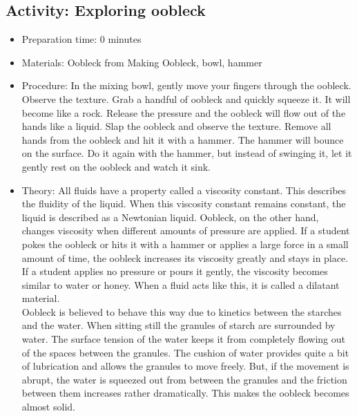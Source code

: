\begin{itemize}
{\begin{itemize}
\subsection{Activity: Exploring oobleck}
\begin{itemize}
\item{Preparation time: 0 minutes}
\item{Materials: Oobleck from Making Oobleck, bowl, hammer}
\item{Procedure: In the mixing bowl, gently move your fingers through the oobleck. Observe the texture. Grab a handful of oobleck and quickly squeeze it. It will become like a rock. Release the pressure and the oobleck will flow out of the hands like a liquid. Slap the oobleck and observe the texture. Remove all hands from the oobleck and hit it with a hammer. The hammer will bounce on the surface. Do it again with the hammer, but instead of swinging it, let it gently rest on the oobleck and watch it sink.}
\item{Theory: All fluids have a property called a viscosity constant. This describes the fluidity of the liquid. When this viscosity constant remains constant, the liquid is described as a Newtonian liquid. Oobleck, on the other hand, changes viscosity when different amounts of pressure are applied. If a student pokes the oobleck or hits it with a hammer or applies a large force in a small amount of time, the oobleck increases its viscosity greatly and stays in place. If a student applies no pressure or pours it gently, the viscosity becomes similar to water or honey. When a fluid acts like this, it is called a dilatant material. \\
Oobleck is believed to behave this way due to kinetics between the starches and the water. When sitting still the granules of starch are surrounded by water. The surface tension of the water keeps it from completely flowing out of the spaces between the granules. The cushion of water provides quite a bit of lubrication and allows the granules to move freely. But, if the movement is abrupt, the water is squeezed out from between the granules and the friction between them increases rather dramatically. This makes the oobleck becomes almost solid. }
\end{itemize}


\end{itemize}}
\end{itemize}

